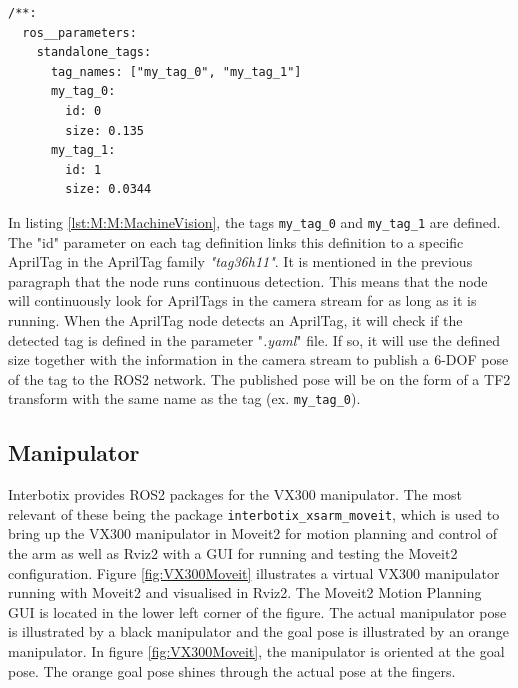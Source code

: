 \begin{lstlisting}[language=XML, label=lst:M:M:MachineVision, caption={Example of AprilTag tag definitions in a ".yaml" file. This example defines two tags of different names, using the tag id 0 and 1 in the defined tag family The size is alse defined for each tag. The tag family (tag36h11) is set in another parameter file.}]
/**:
  ros__parameters:
    standalone_tags:
      tag_names: ["my_tag_0", "my_tag_1"]
      my_tag_0:
        id: 0
        size: 0.135
      my_tag_1:
        id: 1
        size: 0.0344
\end{lstlisting}

In listing \ref{lst:M:M:MachineVision}, the tags \lstinline{my_tag_0} and \lstinline{my_tag_1} are defined. The "id" parameter on each tag definition links this definition to a specific AprilTag in the AprilTag family \textit{"tag36h11"}. It is mentioned in the previous paragraph that the node runs continuous detection. This means that the node will continuously look for AprilTags in the camera stream for as long as it is running. When the AprilTag node detects an AprilTag, it will check if the detected tag is defined in the parameter "\textit{.yaml}" file. If so, it will use the defined size together with the information in the camera stream to publish a 6-DOF pose of the tag to the ROS2 network. The published pose will be on the form of a TF2 transform with the same name as the tag (ex. \lstinline{my_tag_0}).

\subsection{Manipulator}\label{sec:M:MRC:Manipulator}
Interbotix provides ROS2 packages for the VX300 manipulator. The most relevant of these being the package \lstinline{interbotix_xsarm_moveit}, which is used to bring up the VX300 manipulator in Moveit2 for motion planning and control of the arm as well as Rviz2 with a GUI for running and testing the Moveit2 configuration. Figure \ref{fig:VX300Moveit} illustrates a virtual VX300 manipulator running with Moveit2 and visualised in Rviz2. The Moveit2 Motion Planning GUI is located in the lower left corner of the figure. The actual manipulator pose is illustrated by a black manipulator and the goal pose is illustrated by an orange manipulator. In figure \ref{fig:VX300Moveit}, the manipulator is oriented at the goal pose. The orange goal pose shines through the actual pose at the fingers.


